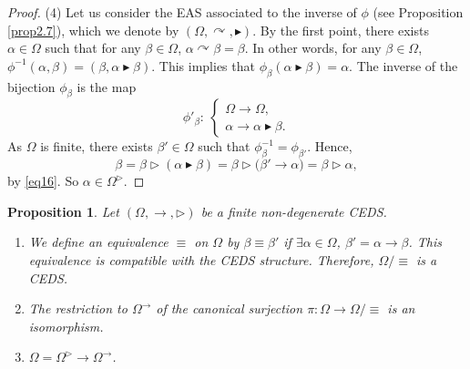 \documentclass[10pt,a4paper]{amsart}
\numberwithin{equation}{section}
\newtheorem{Proposition}[Theorem]{Proposition}
 { \theoremstyle{definition}
\newtheorem{Definition}[Theorem]{Definition}
\newtheorem{Note}[Theorem]{Note}
\newtheorem{Example}[Theorem]{Example}
\newtheorem{Remark}[Theorem]{Remark}
\newtheorem{Notation}[Theorem]{Notation}}
\begin{document}
\begin{proof}
(4) Let us consider the EAS associated to the inverse of $\phi$ (see Proposition \ref{prop2.7}), which we denote by $(\Omega,\curvearrowright,\blacktriangleright)$.
By the first point, there exists $\alpha \in \Omega$ such that for any $\beta \in \Omega$, $\alpha \curvearrowright \beta=\beta$. In other words, for any $\beta \in \Omega$,
$\phi^{-1}(\alpha,\beta)=(\beta,\alpha \blacktriangleright \beta)$.
This implies that $\phi_\beta(\alpha \blacktriangleright \beta)=\alpha$. The inverse of the bijection $\phi_\beta$ is the map
\[\phi'_\beta\colon \ \begin{cases}
\Omega \longrightarrow \Omega,\\
\alpha \longrightarrow \alpha \blacktriangleright \beta.
\end{cases}\]
As $\Omega$ is finite, there exists $\beta'\in \Omega$ such that $\phi_\beta^{-1}=\phi_{\beta'}$. Hence,
\[\beta=\beta \triangleright (\alpha \blacktriangleright \beta)=\beta\triangleright \bigl(\beta'\rightarrow \alpha\bigr)=\beta \triangleright \alpha,\]
by \eqref{eq16}. So $\alpha \in \Omega^\triangleright$. \end{proof}

\begin{Proposition}\label{prop3.11}
Let $(\Omega,\rightarrow,\triangleright)$ be a finite non-degenerate CEDS.
\begin{enumerate}\itemsep=0pt
\item[$(1)$] We define an equivalence $\equiv$ on $\Omega$ by
$\beta \equiv \beta'$ if $\exists \alpha \in \Omega$, $\beta' =\alpha\rightarrow \beta$.
This equivalence is compatible with the CEDS structure. Therefore, $\Omega/\equiv$ is a CEDS.
\item[$(2)$] The restriction to $\Omega^\rightarrow$ of the canonical surjection $\pi\colon\Omega\longrightarrow \Omega/\equiv$ is an isomorphism.
\item[$(3)$] $\Omega=\Omega^\triangleright\rightarrow \Omega^\rightarrow$.
\end{enumerate}\end{Proposition}
\end{document}

